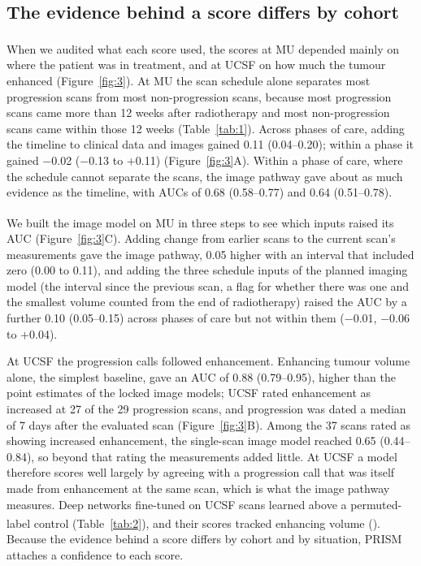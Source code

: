 \documentclass[largeformat]{interact} %
\newcommand{\expl}{\textsuperscript{\textdagger}}
\begin{document}
\subsection{The evidence behind a score differs by cohort}\label{sec:3.3}

When we audited what each score used\expl, the scores at MU depended mainly on where the patient was in treatment,
and at UCSF on how much the tumour enhanced (Figure~\ref{fig:3}). At MU the scan schedule alone separates most
progression scans from most non-progression scans, because most progression scans came more than 12 weeks after
radiotherapy and most non-progression scans came within those 12 weeks (Table~\ref{tab:1}). Across phases of care, adding the timeline to clinical data and images gained 0.11
(0.04--0.20); within a phase it gained $-$0.02 ($-$0.13 to $+$0.11) (Figure~\ref{fig:3}A).
Within a phase of care, where the schedule cannot separate the scans, the image pathway gave about as much evidence as
the timeline, with AUCs of 0.68 (0.58--0.77) and 0.64 (0.51--0.78).

We built the image model on MU in three steps\expl{} to see which inputs raised its AUC (Figure~\ref{fig:3}C). Adding
change from earlier scans to the current scan's measurements gave the image pathway, 0.05 higher with an interval that included zero (0.00 to 0.11), and adding the three
schedule inputs of the planned imaging model (the interval since the previous scan, a flag for whether there was one
and the smallest volume counted from the end of radiotherapy) raised the AUC by a further 0.10 (0.05--0.15) across
phases of care but not within them ($-$0.01, $-$0.06 to $+$0.04).

At UCSF the progression calls followed enhancement. Enhancing tumour volume alone, the simplest baseline, gave
an AUC of 0.88 (0.79--0.95), higher than the point estimates of the locked image models; UCSF rated enhancement as
increased at 27 of the 29 progression scans, and progression was dated a median of 7 days after the evaluated scan
(Figure~\ref{fig:3}B). Among the 37 scans rated as showing increased enhancement, the single-scan image model reached
0.65 (0.44--0.84), so beyond that rating the measurements added little. At UCSF a model therefore scores well
largely by agreeing with a progression call that was itself made from enhancement at the same scan, which is what the
image pathway measures. Deep networks fine-tuned on UCSF scans learned above a permuted-label control
(Table~\ref{tab:2}), and their scores tracked enhancing volume\expl{} (). Because the evidence behind a score differs by cohort and by situation, PRISM attaches
a confidence to each score.
\end{document}
